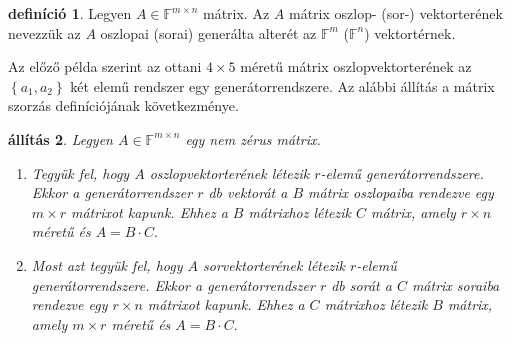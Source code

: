 \documentclass[9pt, a4paper, showtrims]{memoir}
\theoremstyle{plain}
\newtheorem{proposition}{állítás}[chapter]
\theoremstyle{remark}
\theoremstyle{definition}
\newtheorem{definition}[proposition]{definíció}
\begin{document}
\begin{definition}
    Legyen $A\in\mathbb{F}^{m\times n}$ mátrix.
    Az $A$ mátrix oszlop- (sor-) vektorterének nevezzük az $A$ oszlopai (sorai) generálta alterét az $\mathbb{F}^m$ ($\mathbb{F}^n$)
    vektortérnek.
\end{definition}
Az előző példa szerint az ottani $4\times 5$ méretű mátrix oszlopvektorterének az $\left\{ a_1,a_2 \right\}$ két elemű rendszer
egy generátorrendszere.
Az alábbi állítás a mátrix szorzás definíciójának következménye.
\begin{proposition}
    Legyen $A\in\mathbb{F}^{m\times n}$ egy nem zérus mátrix.
    \begin{enumerate}
        \item 
            Tegyük fel, hogy $A$ oszlopvektorterének létezik $r$-elemű generátorrendszere.
            Ekkor a generátorrendszer $r$ db vektorát a $B$ mátrix oszlopaiba rendezve egy $m\times r$ mátrixot kapunk.
            Ehhez a $B$ mátrixhoz létezik $C$ mátrix, amely $r\times n$ méretű és 
            \(
            A=B\cdot C.
            \)
        \item
            Most azt tegyük fel, hogy $A$ sorvektorterének létezik $r$-elemű generátorrendszere.
            Ekkor a generátorrendszer $r$ db sorát a $C$ mátrix soraiba rendezve egy $r\times n$ mátrixot kapunk.
            Ehhez a $C$ mátrixhoz létezik $B$ mátrix, amely $m\times r$ méretű és 
            \(
            A=B\cdot C.
            \)\qedhere
    \end{enumerate}
\end{proposition}
\end{document}
